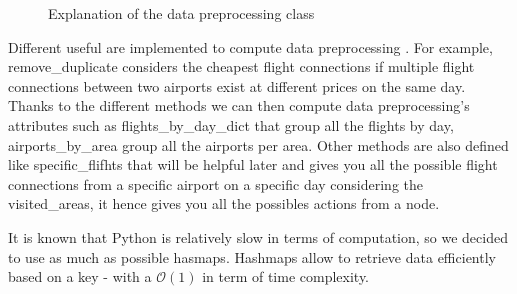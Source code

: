 \begin{figure}[!ht]
    \caption{Explanation of the data preprocessing class}
    \label{fig:data_preprocessing_class}
\end{figure}


Different useful  are implemented to compute data preprocessing . For example, remove\_duplicate considers the cheapest flight connections if multiple flight connections between two airports exist at different prices on the same day.
Thanks to the different methods we can then compute data preprocessing's attributes such as flights\_by\_day\_dict that group all the flights by day, airports\_by\_area group all the airports per area.
Other methods are also defined like specific\_flifhts that will be helpful later and gives you all the possible flight connections from a specific airport on a specific day considering the visited\_areas, it hence gives you all the possibles actions from a node.


It is known that Python is relatively slow in terms of computation, so we decided to use as much as possible hasmaps.
Hashmaps allow to retrieve data efficiently based on a key - with a $\mathcal{O}(1)$ in term of time complexity.


